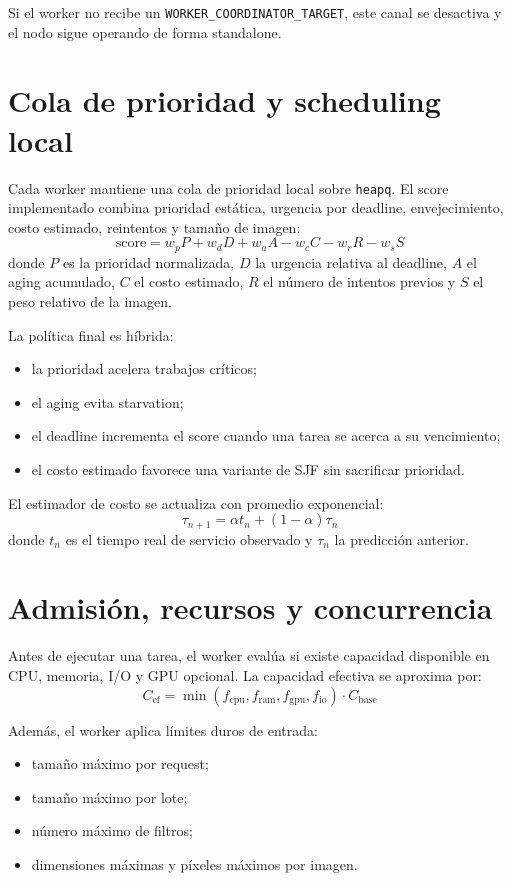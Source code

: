 \documentclass[conference]{IEEEtran}
\begin{document}
Si el worker no recibe un \texttt{WORKER\_COORDINATOR\_TARGET}, este canal se desactiva y el nodo sigue operando de forma standalone.

\section{Cola de prioridad y scheduling local}
Cada worker mantiene una cola de prioridad local sobre \texttt{heapq}. El score implementado combina prioridad estática, urgencia por deadline, envejecimiento, costo estimado, reintentos y tamaño de imagen:
\begin{equation}
\label{eq:score}
\text{score} = w_p P + w_d D + w_a A - w_c C - w_r R - w_s S
\end{equation}
donde $P$ es la prioridad normalizada, $D$ la urgencia relativa al deadline, $A$ el aging acumulado, $C$ el costo estimado, $R$ el número de intentos previos y $S$ el peso relativo de la imagen.

La política final es híbrida:
\begin{itemize}[leftmargin=*]
\item la prioridad acelera trabajos críticos;
\item el aging evita starvation;
\item el deadline incrementa el score cuando una tarea se acerca a su vencimiento;
\item el costo estimado favorece una variante de SJF sin sacrificar prioridad.
\end{itemize}

El estimador de costo se actualiza con promedio exponencial:
\begin{equation}
\tau_{n+1} = \alpha t_n + (1-\alpha)\tau_n
\end{equation}
donde $t_n$ es el tiempo real de servicio observado y $\tau_n$ la predicción anterior.

\section{Admisión, recursos y concurrencia}
Antes de ejecutar una tarea, el worker evalúa si existe capacidad disponible en CPU, memoria, I/O y GPU opcional. La capacidad efectiva se aproxima por:
\begin{equation}
\label{eq:capacity}
C_{\text{ef}} = \min(f_{\text{cpu}}, f_{\text{ram}}, f_{\text{gpu}}, f_{\text{io}})\cdot C_{\text{base}}
\end{equation}

Además, el worker aplica límites duros de entrada:
\begin{itemize}[leftmargin=*]
\item tamaño máximo por request;
\item tamaño máximo por lote;
\item número máximo de filtros;
\item dimensiones máximas y píxeles máximos por imagen.
\end{itemize}
\end{document}
